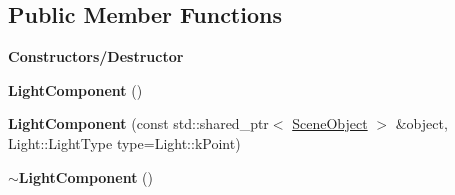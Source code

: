 \subsection*{Public Member Functions}
\begin{Indent}\textbf{ Constructors/\+Destructor}\par
\begin{DoxyCompactItemize}
\item 
\mbox{\label{classrev_1_1_light_component_a635415614d2d54a4cffc4b92e96604d0}} 
{\bfseries Light\+Component} ()
\item 
\mbox{\label{classrev_1_1_light_component_a121ee953f466016ed89d6d95c4027231}} 
{\bfseries Light\+Component} (const std\+::shared\+\_\+ptr$<$ \mbox{\hyperlink{classrev_1_1_scene_object}{Scene\+Object}} $>$ \&object, Light\+::\+Light\+Type type=Light\+::k\+Point)
\item 
\mbox{\label{classrev_1_1_light_component_ae06ff97f6f6cceb3313234c3a8e74bf4}} 
{\bfseries $\sim$\+Light\+Component} ()
\end{DoxyCompactItemize}
\end{Indent}
